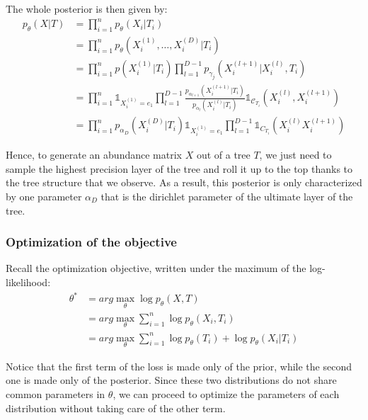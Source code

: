 The whole posterior is then given by:
$$
\begin{align}
    p_{\theta}(X | T) &= \prod_{i=1}^n p_{\theta}(X_i | T_i) \\
                    &= \prod_{i=1}^n p_{\theta}(X_i^{(1)}, \dots, X_i^{(D)} | T_i) \\
                    &= \prod_{i=1}^n p(X_i^{(1)} | T_i) \prod_{l=1}^{D-1} p_{\gamma_j}(X_i^{(l+1)} | X_i^{(l)}, T_i) \\
                    &= \prod_{i=1}^n \mathds{1}_{X_i^{(1)} = e_1} \prod_{l=1}^{D-1} \frac{p_{\alpha_{l+1}}(X_i^{(l+1)} | T_i)}{p_{\alpha_{l}}(X_i^{(l)} | T_i)} \mathds{1}_{\mathcal{C}_{T_i}}\left(X_i^{(l)}, X_i^{(l+1)}\right) \\
                    &= \prod_{i=1}^n p_{\alpha_{D}}(X_i^{(D)} | T_i) \mathds{1}_{X_i^{(1)} = e_1} \prod_{l=1}^{D-1} \mathds{1}_{C_{T_i}}(X_i^{(l)} X_i^{(l+1)})
\end{align}
$$

Hence, to generate an abundance matrix $X$ out of a tree $T$, we just need to sample the highest precision layer of the tree
and roll it up to the top thanks to the tree structure that we observe.
As a result, this posterior is only characterized by one parameter $\alpha_D$ that is the dirichlet parameter of the ultimate layer of the tree.

\subsubsection{Optimization of the objective}

Recall the optimization objective, written under the maximum of the log-likelihood:
$$
\begin{align}
    \theta^* &= arg \max_{\theta} \log p_{\theta}(X,T) \\
            &= arg \max_{\theta} \sum_{i=1}^n \log p_{\theta}(X_i, T_i) \\
            &= arg \max_{\theta} \sum_{i=1}^n \log p_{\theta}(T_i) + \log p_{\theta}(X_i | T_i)
\end{align}
$$

Notice that the first term of the loss is made only of the prior, while the second one is made only of the posterior.
Since these two distributions do not share common parameters in $\theta$, we can proceed to optimize the parameters of each distribution
without taking care of the other term. \\

\newcommand{\transitionproba}{\pi_{a \rightarrow b}}
\newcommand{\transitionprobasum}{\pi_{u_j^{(k)} \rightarrow u_{j+1}^{(k)}}}
\newcommand{\transitionbranch}{b_{a \rightarrow b}^{(i)}}
\newcommand{\children}{\mathcal{C}}
\newcommand{\lagrangian}{\mathcal{L}}


